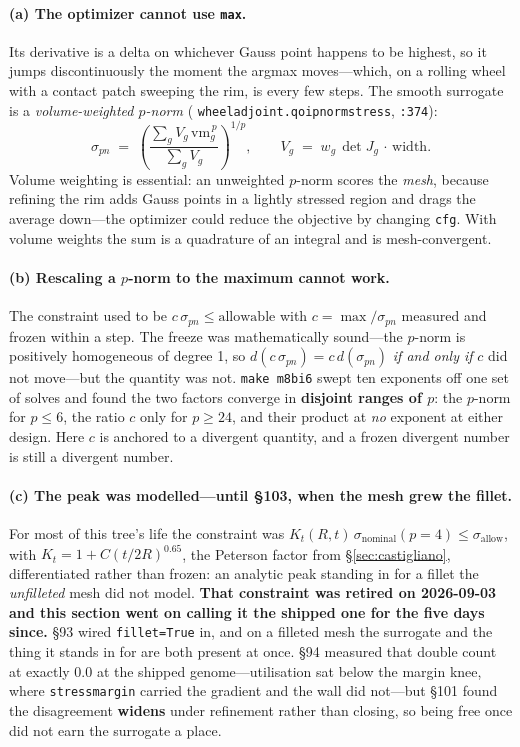 \documentclass[11pt,a4paper]{article}
\DeclareRobustCommand{\code}[1]{%
  \texttt{\small\def\_{\textunderscore\discretionary{}{}{}}#1}}
\begin{document}
\paragraph{(a) The optimizer cannot use \texttt{max}.}
Its derivative is a delta on whichever Gauss point happens to be highest, so it jumps
discontinuously the moment the argmax moves---which, on a rolling wheel with a contact
patch sweeping the rim, is every few steps. The smooth surrogate is a
\emph{volume-weighted $p$-norm} (\code{wheel\_adjoint.\_qoi\_pnorm\_stress},
\code{:374}):
%
\begin{equation}
  \sigma_{pn} \;=\;
  \left(\frac{\sum_g V_g\,\mathrm{vm}_g^{\,p}}{\sum_g V_g}\right)^{\!1/p},
  \qquad
  V_g \;=\; w_g\,\det J_g\,\cdot\,\mathrm{width}.
  \label{eq:pnorm}
\end{equation}
%
Volume weighting is essential: an unweighted $p$-norm scores the \emph{mesh}, because
refining the rim adds Gauss points in a lightly stressed region and drags the average
down---the optimizer could reduce the objective by changing \code{cfg}. With volume
weights the sum is a quadrature of an integral and is mesh-convergent.

\paragraph{(b) Rescaling a $p$-norm to the maximum cannot work.}
The constraint used to be $c\,\sigma_{pn} \le \mathrm{allowable}$ with
$c = \max/\sigma_{pn}$ measured and frozen within a step. The freeze was mathematically
sound---the $p$-norm is positively homogeneous of degree 1, so
$d(c\,\sigma_{pn}) = c\,d(\sigma_{pn})$ \emph{if and only if} $c$ did not move---but the
quantity was not. \code{make m8bi6} swept ten exponents off one set of solves and found
the two factors converge in \textbf{disjoint ranges of $p$}: the $p$-norm for
$p \le 6$, the ratio $c$ only for $p \ge 24$, and their product at \emph{no} exponent at
either design. Here $c$ is anchored to a divergent quantity, and a frozen divergent
number is still a divergent number.

\paragraph{(c) The peak was modelled---until \S103, when the mesh grew the fillet.}
For most of this tree's life the constraint was
$K_t(R, t)\,\sigma_{\text{nominal}}(p{=}4) \le \sigma_{\text{allow}}$, with
$K_t = 1 + C(t/2R)^{0.65}$, the Peterson factor from \S\ref{sec:castigliano},
differentiated rather than frozen: an analytic peak standing in for a fillet the
\emph{unfilleted} mesh did not model. \textbf{That constraint was retired on 2026-09-03
and this section went on calling it the shipped one for the five days since.} \S93 wired
\code{fillet=True} in, and on a filleted mesh the surrogate and the thing it stands in
for are both present at once. \S94 measured that double count at exactly $0.0$ at the
shipped genome---utilisation sat below the margin knee, where \code{stress\_margin}
carried the gradient and the wall did not---but \S101 found the disagreement
\textbf{widens} under refinement rather than closing, so being free once did not earn the
surrogate a place.
\end{document}
